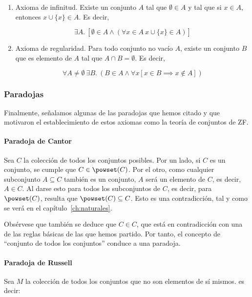 \begin{enumerate}
  \item Axioma de infinitud. Existe un conjunto $A$ tal que $\emptyset \in
    A$ y tal que si $x \in A$, entonces $x \cup \{x\} \in A$. Es decir,

    \[ \exists A.\ [\emptyset \in A \land (\forall x \in A \ x \cup \{x\}
    \in A)] \]

  \item Axioma de regularidad. Para todo conjunto no vacío $A$, existe un
    conjunto $B$ que es elemento de $A$ tal que $A \cap B = \emptyset$. Es
    decir,

    \[ \forall A \neq \emptyset \ \exists B.\ (B \in A \land \forall x[x \in
    B \implies x \notin A]) \]
\end{enumerate}




\subsubsection{Paradojas}

Finalmente, señalamos algunas de las paradojas que hemos citado y que
motivaron el establecimiento de estos axiomas como la teoría de conjuntos de
ZF.


\paragraph{Paradoja de Cantor} Sea $C$ la colección de todos los conjuntos
posibles. Por un lado, si $C$ es un conjunto, se cumple que $C \in
\powset(C)$. Por el otro, como cualquier subconjunto $A \subseteq C$ también
es un conjunto, $A$ será un elemento de $C$, es decir, $A \in C$. Al darse
esto para todos los subconjuntos de $C$, es decir, para $\powset(C)$,
resulta que $\powset(C) \subseteq C$. Esto es una contradicción, tal y como
se verá en el capítulo~\ref{ch:naturales}.

Obsérvese que también se deduce que $C \in C$, que está en contradicción con
una de las reglas básicas de las que hemos partido. Por tanto, el concepto
de ``conjunto de todos los conjuntos'' conduce a una paradoja.

\paragraph{Paradoja de Russell} Sea $M$ la colección de todos los conjuntos
que no son elementos de sí mismos. es decir:

